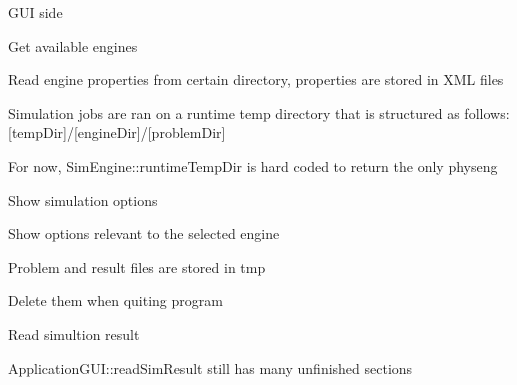 G\+UI side
\begin{DoxyItemize}
\item Get available engines
\begin{DoxyItemize}
\item Read engine properties from certain directory, properties are stored in X\+ML files
\item Simulation jobs are ran on a runtime temp directory that is structured as follows\+: \mbox{[}temp\+Dir\mbox{]}/\mbox{[}engine\+Dir\mbox{]}/\mbox{[}problem\+Dir\mbox{]}
\item For now, Sim\+Engine\+::runtime\+Temp\+Dir is hard coded to return the only physeng
\end{DoxyItemize}
\item Show simulation options
\begin{DoxyItemize}
\item Show options relevant to the selected engine
\end{DoxyItemize}
\item Problem and result files are stored in tmp
\begin{DoxyItemize}
\item Delete them when quiting program
\end{DoxyItemize}
\item Read simultion result
\begin{DoxyItemize}
\item Application\+G\+U\+I\+::read\+Sim\+Result still has many unfinished sections
\end{DoxyItemize}
\end{DoxyItemize}

